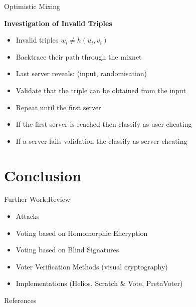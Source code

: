 \documentclass{beamer}
\begin{document}
\begin{frame}[allowframebreaks]{Optimistic Mixing \cite{Opt02}}
\framebreak

\textbf{Investigation of Invalid Triples}
\begin{itemize}
\item Invalid triples $ w_i \neq h(u_i,v_i) $
\item Backtrace their path through the mixnet
\item Last server reveals: (input, randomisation)
\item Validate that the triple can be obtained from the input
\item Repeat until the first server
\item If the first server is reached then classify as user cheating
\item If a server fails validation the classify as server cheating
\end{itemize}


\end{frame}

\section{Conclusion}

\begin{frame}{Further Work:Review}
\begin{itemize}
\item Attacks
\item Voting based on Homomorphic Encryption
\item Voting based on Blind Signatures
\item Voter Verification Methods (visual cryptography)
\item Implementations (Helios, Scratch \& Vote, PretaVoter)
\end{itemize}
\end{frame}

\begin{frame}[allowframebreaks]{References}
\begin{small}


\end{small}
\end{frame}

 
\end{document}
